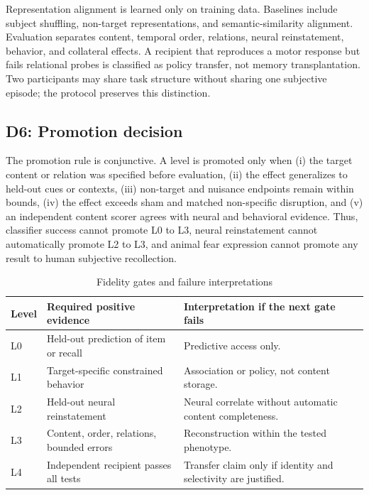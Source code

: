 \documentclass[conference]{IEEEtran}
\begin{document}
Representation alignment is learned only on training data. Baselines include subject shuffling, non-target representations, and semantic-similarity alignment. Evaluation separates content, temporal order, relations, neural reinstatement, behavior, and collateral effects. A recipient that reproduces a motor response but fails relational probes is classified as policy transfer, not memory transplantation. Two participants may share task structure without sharing one subjective episode; the protocol preserves this distinction.

\subsection{D6: Promotion decision}
The promotion rule is conjunctive. A level is promoted only when (i) the target content or relation was specified before evaluation, (ii) the effect generalizes to held-out cues or contexts, (iii) non-target and nuisance endpoints remain within bounds, (iv) the effect exceeds sham and matched non-specific disruption, and (v) an independent content scorer agrees with neural and behavioral evidence. Thus, classifier success cannot promote L0 to L3, neural reinstatement cannot automatically promote L2 to L3, and animal fear expression cannot promote any result to human subjective recollection.

\begin{table}[t]
\caption{Fidelity gates and failure interpretations}
\label{tab:gates}
\centering
\footnotesize
\setlength{\tabcolsep}{2pt}
\begin{tabular}{p{}p{}p{}}
\toprule
Level & Required positive evidence & Interpretation if the next gate fails \\
\midrule
L0 & Held-out prediction of item or recall & Predictive access only. \\
L1 & Target-specific constrained behavior & Association or policy, not content storage. \\
L2 & Held-out neural reinstatement & Neural correlate without automatic content completeness. \\
L3 & Content, order, relations, bounded errors & Reconstruction within the tested phenotype. \\
L4 & Independent recipient passes all tests & Transfer claim only if identity and selectivity are justified. \\
\bottomrule
\end{tabular}
\end{table}
\end{document}
